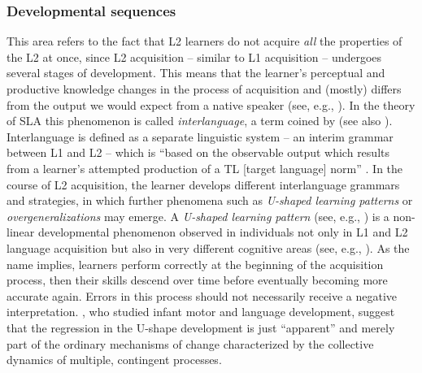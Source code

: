 \subsubsection{Developmental sequences}
This area refers to the fact that L2 learners do not acquire \textit{all} the properties of the L2 at once, since L2 acquisition -- similar to L1 acquisition -- undergoes several stages of development. This means that the learner’s perceptual and productive knowledge changes in the process of acquisition and (mostly) differs from the output we would expect from a native speaker (see, e.g., \citealt{Major1994}). In the theory of SLA this phenomenon is called \textit{interlanguage}, a term coined by \citealt{Selinker1972} (see also \citealt{Selinker1969}). Interlanguage is defined as a separate linguistic system -- an interim grammar between L1 and L2 -- which is “based on the observable output which results from a learner’s attempted production of a TL [target language] norm” \citep[214]{Selinker1972}. In the course of L2 acquisition, the learner develops different interlanguage grammars and strategies, in which further phenomena such as \textit{U-shaped learning patterns} or \textit{overgeneralizations} may emerge. A \textit{U-shaped learning pattern} (see, e.g., \citealt{Abrahamsson2003}) is a non-linear developmental phenomenon observed in individuals not only in L1 and L2 language acquisition but also in very different cognitive areas (see, e.g., \citealt{CarlucciEtAl2005}). As the name implies, learners perform correctly at the beginning of the acquisition process, then their skills descend over time before eventually becoming more accurate again. Errors in this process should not necessarily receive a negative interpretation. \citet{Gershkoff-StoweThelen2004}, who studied infant motor and language development, suggest that the regression in the U-shape development is just “apparent” and merely part of the ordinary mechanisms of change characterized by the collective dynamics of multiple, contingent processes.



